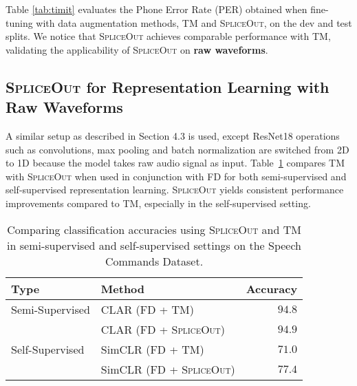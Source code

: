 \documentclass{article}
\newcommand{\SpA}{{\textsc{SpliceOut}}\xspace}
\begin{document}
Table \ref{tab:timit} evaluates the Phone Error Rate (PER) obtained when fine-tuning with data augmentation methods, TM and \SpA, on the dev and test splits. We notice that \SpA achieves comparable performance with TM, validating the applicability of \SpA on \textbf{raw waveforms}. 

\subsection{\SpA for Representation Learning with Raw Waveforms}

A similar setup as described in Section 4.3 is used, except ResNet18 operations such as convolutions, max pooling and batch normalization are switched from 2D to 1D
because the model takes raw audio signal as input. Table~\ref{tab:clarraw} compares TM with \SpA when used in conjunction with FD for both semi-supervised and self-supervised representation learning. \SpA yields consistent performance improvements compared to TM, especially in the self-supervised setting.

\begin{table}[h]
    \centering
    \caption{Comparing classification accuracies using \SpA and TM in semi-supervised and self-supervised settings on the Speech Commands Dataset.}
    \begin{tabular}{ll|r}
    \toprule
         Type & Method & Accuracy\\
         \midrule
         Semi-Supervised & CLAR (FD + TM)~\citep{clar} & $94.8$\\
         &CLAR (FD + \SpA) & $\mathbf{94.9}$\\
         \midrule
         Self-Supervised & SimCLR (FD + TM)~\citep{clar} & $71.0$\\
         & SimCLR (FD + \SpA) & $\mathbf{77.4}$\\
    \bottomrule
    \end{tabular}
    \label{tab:clarraw}
\end{table}
\end{document}
